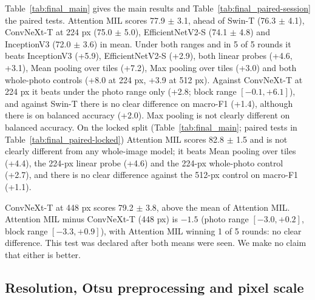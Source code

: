 
Table~\ref{tab:final_main} gives the main results and Table~\ref{tab:final_paired-session} the paired tests.
Attention MIL scores 77.9 $\pm$ 3.1, ahead of Swin-T (76.3 $\pm$ 4.1), ConvNeXt-T at 224 px (75.0 $\pm$ 5.0),
EfficientNetV2-S (74.1 $\pm$ 4.8) and InceptionV3 (72.0 $\pm$ 3.6) in mean. Under both ranges and in 5 of 5 rounds it
beats InceptionV3 (+5.9), EfficientNetV2-S (+2.9), both linear probes (+4.6, +3.1), Mean pooling over tiles (+7.2), Max pooling
over tiles (+3.0) and both whole-photo controls (+8.0 at 224 px, +3.9 at 512 px). Against ConvNeXt-T at 224 px it beats
under the photo range only (+2.8; block range $[-0.1, +6.1]$), and against Swin-T there is no clear difference on
macro-F1 (+1.4), although there is on balanced accuracy (+2.0). Max pooling is not clearly different on balanced accuracy.
On the locked split (Table~\ref{tab:final_main}; paired tests in Table~\ref{tab:final_paired-locked}) Attention MIL scores
82.8 $\pm$ 1.5 and is not clearly different from any whole-image model; it beats Mean pooling over tiles (+4.4), the 224-px
linear probe (+4.6) and the 224-px whole-photo control (+2.7), and there is no clear difference against the 512-px control
on macro-F1 (+1.1).

ConvNeXt-T at 448 px scores 79.2 $\pm$ 3.8, above the mean of Attention MIL. Attention MIL minus ConvNeXt-T (448 px) is
$-1.5$ (photo range $[-3.0, +0.2]$, block range $[-3.3, +0.9]$), with Attention MIL winning 1 of 5 rounds: no clear
difference. This test was declared after both means were seen. We make no claim that either is better.

\subsection{Resolution, Otsu preprocessing and pixel scale}
\label{sec:res:resolution}


